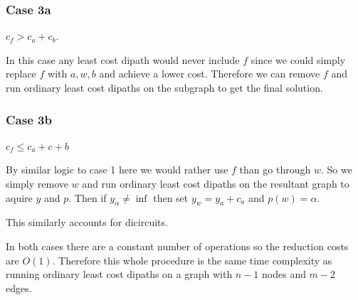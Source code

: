\documentclass{article}
\begin{document}
\subsubsection*{Case 3a}
$c_f > c_a + c_b$. 

In this case any least cost dipath would never include $f$ since we could simply replace $f$ with $a, w, b$ and
achieve a lower cost. Therefore we can remove $f$ and run ordinary least cost dipaths on the subgraph to get the final solution.



\subsubsection*{Case 3b}
$c_f \leq c_a + c+b$

By similar logic to case 1 here we would rather use $f$ than go through $w$. So we simply remove $w$ and run ordinary least cost dipaths on the resultant graph to aquire $y$ and $p$. Then if $y_\alpha \neq \inf$ then set $y_w = y_a + c_a$ and $p(w) = \alpha$. 

This similarly accounts for dicircuits. 

In both cases there are a constant number of operations so the reduction costs are $O(1)$. Therefore this whole procedure is the same time complexity as running ordinary least cost dipaths on a graph with $n-1$ nodes and $m-2$ edges. 
\end{document}
